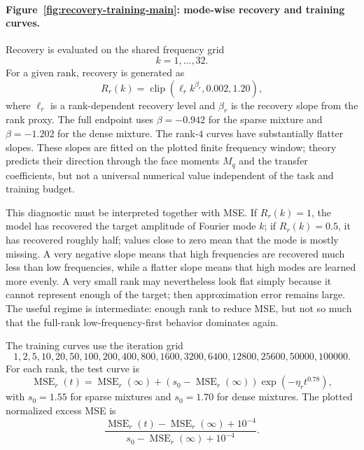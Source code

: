 \paragraph{Figure~\ref{fig:recovery-training-main}: mode-wise recovery and training curves.}
Recovery is evaluated on the shared frequency grid
\begin{equation}
k=1,\ldots,32.
\end{equation}
For a given rank, recovery is generated as
\begin{equation}
R_r(k)=\operatorname{clip}\left(\ell_r k^{\beta_r},0.002,1.20\right),
\end{equation}
where $\ell_r$ is a rank-dependent recovery level and $\beta_r$ is the recovery slope from the rank proxy. The full endpoint uses $\beta=-0.942$ for the sparse mixture and $\beta=-1.202$ for the dense mixture. The rank-$4$ curves have substantially flatter slopes. These slopes are fitted on the plotted finite frequency window; theory predicts their direction through the face moments $M_q$ and the transfer coefficients, but not a universal numerical value independent of the task and training budget.

This diagnostic must be interpreted together with MSE. If $R_r(k)=1$, the model has recovered the target amplitude of Fourier mode $k$; if $R_r(k)=0.5$, it has recovered roughly half; values close to zero mean that the mode is mostly missing. A very negative slope means that high frequencies are recovered much less than low frequencies, while a flatter slope means that high modes are learned more evenly. A very small rank may nevertheless look flat simply because it cannot represent enough of the target; then approximation error remains large. The useful regime is intermediate: enough rank to reduce MSE, but not so much that the full-rank low-frequency-first behavior dominates again.

The training curves use the iteration grid
\begin{equation}
1,2,5,10,20,50,100,200,400,800,1600,3200,6400,12800,25600,50000,100000.
\end{equation}
For each rank, the test curve is
\begin{equation}
\operatorname{MSE}_r(t)
=
\operatorname{MSE}_r(\infty)
+(s_0-\operatorname{MSE}_r(\infty))
\exp(-\eta_r t^{0.78}),
\end{equation}
with $s_0=1.55$ for sparse mixtures and $s_0=1.70$ for dense mixtures. The plotted normalized excess MSE is
\begin{equation}
\frac{\operatorname{MSE}_r(t)-\operatorname{MSE}_r(\infty)+10^{-4}}
{s_0-\operatorname{MSE}_r(\infty)+10^{-4}}.
\end{equation}

